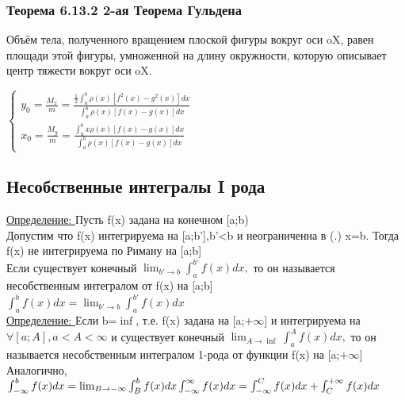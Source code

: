 \documentclass[12pt]{article}
\begin{document}
\begin{enumerate}
        \subsubsection*{Теорема 6.13.2 2-ая Теорема Гульдена}\label{th:6.13.2}
        Объём тела, полученного вращением плоской фигуры вокруг оси oX, равен площади этой фигуры, умноженной на длину окружности, которую описывает центр тяжести вокруг оси oX.\par\noindent
        $\begin{cases}
            y_0=\frac{M_x}{m}=\frac{\frac{1}{2}\int_{a}^{b}\rho (x)[f^2(x)-g^2(x)]dx}{\int_{a}^{b}\rho(x)[f(x)-g(x)]dx}\\
            x_0=\frac{M_y}{m}=\frac{\int_{a}^{b}x\rho (x)[f(x)-g(x)]dx}{\int_{a}^{b}\rho (x)[f(x)-g(x)]dx}
        \end{cases}$
    \end{enumerate}
    \subsection{Несобственные интегралы I рода}
    \underline{Определение: } Пусть f(x) задана на конечном [a;b)\\
    Допустим что f(x) интегрируема на [a;b'],b'<b и неограниченна в (.) x=b. Тогда f(x) не интегрируема по Риману на [a;b] \\
    Если существует конечный $\lim_{b' \to b} \int_{a}^{b'}f(x)dx,$ то он называется несобственным интегралом от f(x) на [a;b]\\
    $\int_{a}^{b}f(x)dx=\lim_{b' \to b}\int_{a}^{b'} f(x)dx$\\
    \underline{Определение: } Если b=$\inf$, т.е. f(x) задана на [a;$+ \infty]$ и интегрируема на $\forall [a;A],a<A<\infty$ и существует конечный
    $\lim_{A \to \inf}\int_{a}^{A} f(x)dx,$ то он называется несобственным интегралом 1-рода от функции f(x) на [a;$+\infty$]\\
    Аналогично, $\int_{-\infty}^{b}f(x)dx=\lim_{B \to -\infty} \int_{B}^{b}f(x)dx\\
    \int_{-\infty}^{\infty} f(x)dx=\int_{-\infty}^{C}f(x)dx+\int_{C}^{+\infty}f(x)dx$
\end{document}

